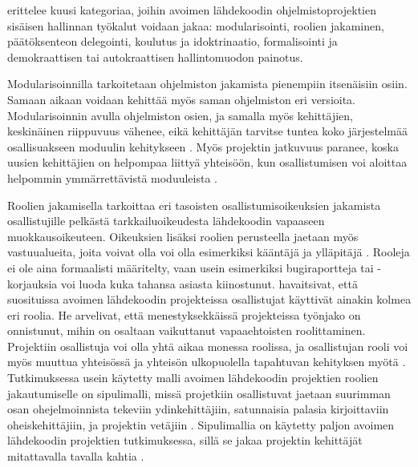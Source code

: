 \documentclass[utf8]{gradu3}
\begin{document}
\textcite{Laat-2007} erittelee kuusi kategoriaa, joihin avoimen lähdekoodin
ohjelmistoprojektien sisäisen hallinnan työkalut voidaan jakaa: modularisointi,
roolien jakaminen, päätöksenteon delegointi, koulutus ja idoktrinaatio,
formalisointi ja demokraattisen tai autokraattisen hallintomuodon painotus.

Modularisoinnilla tarkoitetaan ohjelmiston jakamista pienempiin itsenäisiin
osiin. Samaan aikaan voidaan kehittää myös saman ohjelmiston eri versioita.
Modularisoinnin avulla ohjelmiston osien, ja samalla myös kehittäjien,
keskinäinen riippuvuus vähenee, eikä kehittäjän tarvitse tuntea koko
järjestelmää osallisuakseen moduulin kehitykseen \parencite{Lee-2001}. Myös
projektin jatkuvuus paranee, koska uusien kehittäjien on helpompaa liittyä
yhteisöön, kun osallistumisen voi aloittaa helpommin ymmärrettävistä moduuleista
\parencite{Aberdour-2007,Lee-2001}.

Roolien jakamisella \textcite{Laat-2007} tarkoittaa eri tasoisten
osallistumisoikeuksien jakamista osallistujille pelkästä tarkkailuoikeudesta
lähdekoodin vapaaseen muokkausoikeuteen. Oikeuksien lisäksi roolien perusteella
jaetaan myös vastuualueita, joita voivat olla voi olla esimerkiksi kääntäjä ja
ylläpitäjä \parencite{Laat-2007}. Rooleja ei ole aina formaalisti määritelty,
vaan usein esimerkiksi bugiraportteja tai -korjauksia voi luoda kuka tahansa
asiasta kiinostunut. \textcite{Yuan-2010} havaitsivat, että suosituissa avoimen
lähdekoodin projekteissa osallistujat käyttivät ainakin kolmea eri roolia. He
arvelivat, että menestyksekkäissä projekteissa työnjako on onnistunut, mihin on
osaltaan vaikuttanut vapaaehtoisten roolittaminen. Projektiin osallistuja voi
olla yhtä aikaa monessa roolissa, ja osallistujan rooli voi myös muuttua
yhteisössä ja yhteisön ulkopuolella tapahtuvan kehityksen myötä
\parencite{Trinkenreich-2020}. Tutkimuksessa usein käytetty malli avoimen
lähdekoodin projektien roolien jakautumiselle on sipulimalli, missä projetkiin
osallistuvat jaetaan  suurimman osan ohejelmoinnista tekeviin ydinkehittäjiin,
satunnaisia palasia kirjoittaviin oheiskehittäjiin, ja projektin vetäjiin
\parencite{Crowston-2005, Mockus-2002}. Sipulimallia on käytetty paljon avoimen
lähdekoodin projektien tutkimuksessa, sillä se jakaa projektin kehittäjät
mitattavalla tavalla kahtia \parencite[esim.][]{Setia-2012,Alfayez-2017}.
\end{document}
